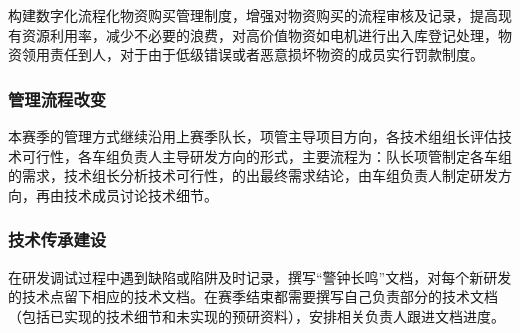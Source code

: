         构建数字化流程化物资购买管理制度，增强对物资购买的流程审核及记录，提高现有资源利用率，减少不必要的浪费，对高价值物资如电机进行出入库登记处理，物资领用责任到人，对于由于低级错误或者恶意损坏物资的成员实行罚款制度。\par

    \subsubsection{管理流程改变}

        本赛季的管理方式继续沿用上赛季队长，项管主导项目方向，各技术组组长评估技术可行性，各车组负责人主导研发方向的形式，主要流程为：队长项管制定各车组的需求，技术组长分析技术可行性，的出最终需求结论，由车组负责人制定研发方向，再由技术成员讨论技术细节。\par

    \subsubsection{技术传承建设}

        在研发调试过程中遇到缺陷或陷阱及时记录，撰写“警钟长鸣”文档，对每个新研发的技术点留下相应的技术文档。在赛季结束都需要撰写自己负责部分的技术文档（包括已实现的技术细节和未实现的预研资料），安排相关负责人跟进文档进度。\par